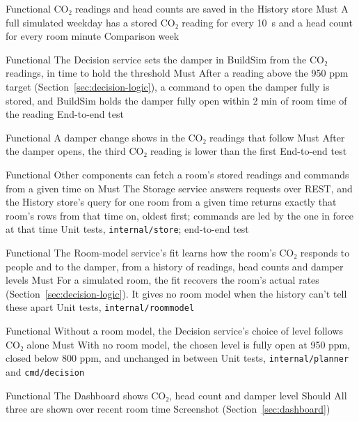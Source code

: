 
  {Functional}
  {CO₂ readings and head counts are saved in the History store}
  {Must}
  {A full simulated weekday has a stored CO₂ reading for every 10~s and a head
   count for every room minute}
  {Comparison week}

  {Functional}
  {The Decision service sets the damper in BuildSim from the CO₂ readings, in
   time to hold the threshold}
  {Must}
  {After a reading above the 950 ppm target
   (Section~\ref{sec:decision-logic}), a command to open the damper fully is
   stored, and BuildSim holds the damper fully open within 2 min of room time
   of the reading}
  {End-to-end test}

  {Functional}
  {A damper change shows in the CO₂ readings that follow}
  {Must}
  {After the damper opens, the third CO₂ reading is lower than the first}
  {End-to-end test}

  {Functional}
  {Other components can fetch a room's stored readings and commands from a
   given time on}
  {Must}
  {The Storage service answers requests over REST, and the History
   store's query for one room from a given time returns exactly that room's
   rows from that time on, oldest first; commands are led by the one in force
   at that time}
  {Unit tests, \texttt{internal/store}; end-to-end test}

  {Functional}
  {The Room-model service's fit learns how the room's CO₂ responds to people
   and to the damper, from a history of readings, head counts and damper
   levels}
  {Must}
  {For a simulated room, the fit recovers the room's actual rates (Section~\ref{sec:decision-logic}). It gives no room
   model when the history can't tell these apart}
  {Unit tests, \texttt{internal/roommodel}}

  {Functional}
  {Without a room model, the Decision service's choice of level follows CO₂
   alone}
  {Must}
  {With no room model, the chosen level is fully open at 950 ppm, closed
   below 800 ppm, and unchanged in between}
  {Unit tests, \texttt{internal/planner} and \texttt{cmd/decision}}

  {Functional}
  {The Dashboard shows CO₂, head count and damper level}
  {Should}
  {All three are shown over recent room time}
  {Screenshot (Section~\ref{sec:dashboard})}

